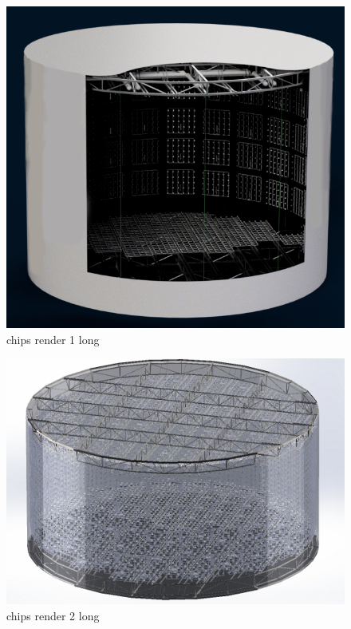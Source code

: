 \begin{figure}
    \includegraphics[width=\textwidth]{diagrams/4-chips/chips_render_1.png}
    \caption[chips render 1 short]{chips render 1 long}
    \label{fig:chips_render_1}
\end{figure}
\begin{figure}
    \includegraphics[width=\textwidth]{diagrams/4-chips/chips_render_2.png}
    \caption[chips render 2 short]{chips render 2 long}
    \label{fig:chips_render_2}
\end{figure}
